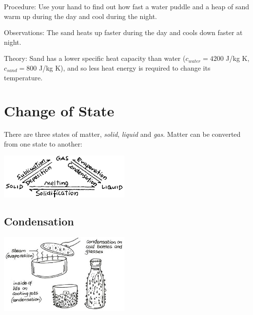 \begin{multicols}{2}
\begin{description*}
\item[Procedure:]{Use your hand to find out how fast a water puddle and a heap of sand warm up during the day and cool during the night.}
\item[Observations:]{The sand heats up faster during the day and cools down faster at night.}
\item[Theory:]{Sand has a lower specific heat capacity than water ($c_{water} = 4200$ J/kg K, $c_{sand} = 800$ J/kg K), and so less heat energy is required to change its temperature.}
\end{description*}


\section*{Change of State} 

There are three states of matter, \emph{solid}, \emph{liquid} and \emph{gas}. Matter can be converted from one state to another:

\begin{center}
\includegraphics[width=0.49\textwidth]{./img/source/change-of-state.png}
\end{center}


\subsection{Condensation} 

\begin{center}
\includegraphics[width=0.49\textwidth]{./img/vso/condensation.jpg}
\end{center}


\end{multicols}
